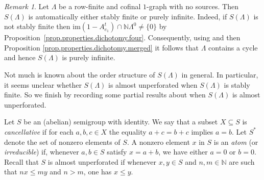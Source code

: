 \documentclass[a4paper, 12pt]{amsart}
\numberwithin{equation}{section}
\newcounter{theorem}
\theoremstyle{remark}
\newtheorem{remark}[theorem]{Remark}
\theoremstyle{definition}
\begin{document}
\begin{remark}
Let $\Lambda$ be a row-finite and cofinal $1$-graph with no sources. Then $S(\Lambda)$ is
automatically either stably finite or purely infinite. Indeed, if $S(\Lambda)$ is not
stably finite then $\textrm{im} (1-A^t_{e_1}) \cap {\mathbb{N}}\Lambda^0\neq \{0\}$ by
Proposition~\ref{prop.properties.dichotomy.four}. Consequently, using \cite[Lemma
4.2]{MR3507995} and then Proposition \ref{prop.properties.dichotomy.merged} it follows
that $\Lambda$ contains a cycle and hence $S(\Lambda)$ is purely infinite.
\end{remark}

Not much is known about the order structure of $S(\Lambda)$ in general. In particular, it
seems unclear whether $S(\Lambda)$ is almost unperforated when $S(\Lambda)$ is stably
finite. So we finish by recording some partial results about when $S(\Lambda)$ is almost
unperforated.

Let $S$ be an (abelian) semigroup with identity. We say that a subset $X\subseteq S$ is
\emph{cancellative} if for each $a,b,c\in X$ the equality $a + c = b + c$ implies $a =
b$. Let $S^*$ denote the set of nonzero elements of $S$.  A nonzero element $x$ in $S$ is
an \emph{atom} (or \emph{irreducible}) if, whenever $a,b\in S$ satisfy $x = a + b$, we
have either $a = 0$ or $b = 0$. Recall that $S$ is almost unperforated if whenever $x, y
\in S$ and $n, m \in {\mathbb{N}}$ are such that $nx \leq  my$ and $n > m$, one has $x\leq y$.
\end{document}
